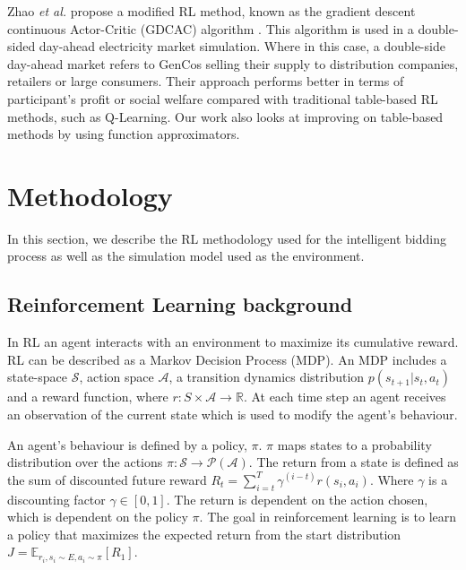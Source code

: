 \documentclass[conference]{IEEEtran}
\begin{document}
Zhao \textit{et al.} propose a modified RL method, known as the gradient descent continuous Actor-Critic (GDCAC) algorithm \cite{Zhao2016}. This algorithm is used in a double-sided day-ahead electricity market simulation. Where in this case, a double-side day-ahead market refers to GenCos selling their supply to distribution companies, retailers or large consumers. Their approach performs better in terms of participant's profit or social welfare compared with traditional table-based RL methods, such as Q-Learning. Our work also looks at improving on table-based methods by using function approximators.





\section{Methodology}
\label{sec:material}

In this section, we describe the RL methodology used for the intelligent bidding process as well as the simulation model used as the environment.

\subsection{Reinforcement Learning background}


In RL an agent interacts with an environment to maximize its cumulative reward. RL can be described as a Markov Decision Process (MDP). An MDP includes a state-space $\mathcal{S}$, action space $\mathcal{A}$, a transition dynamics distribution $p(s_{t+1}|s_t,a_t)$ and a reward function, where $r:S\times \mathcal{A} \rightarrow \mathbb{R}$. At each time step an agent receives an observation of the current state which is used to modify the agent's behaviour.

An agent's behaviour is defined by a policy, $\pi$. $\pi$ maps states to a probability distribution over the actions $\pi:\mathcal{S}\rightarrow \mathcal{P}(\mathcal{A})$. The return from a state is defined as the sum of discounted future reward $R_t=\sum_{i=t}^T\gamma^{(i-t)}r(s_i,a_i)$. Where $\gamma$ is a discounting factor $\gamma \in [0,1]$. The return is dependent on the action chosen, which is dependent on the policy $\pi$. The goal in reinforcement learning is to learn a policy that maximizes the expected return from the start distribution $J=\mathbb{E}_{r_i,s_i \sim E,a_i \sim \pi}[R_1]$. 
\end{document}
